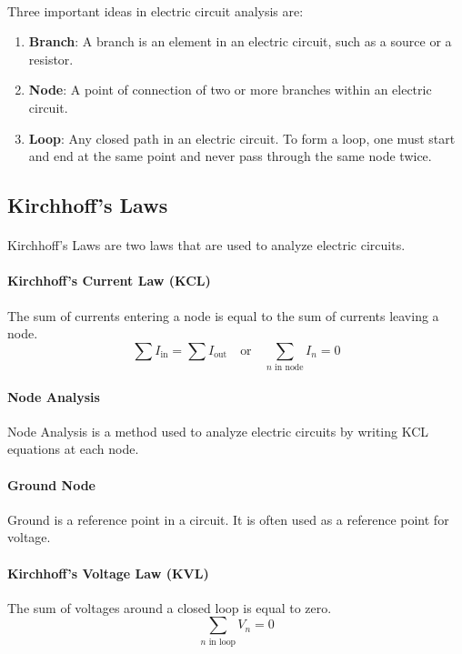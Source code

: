 \documentclass[11pt]{article}
\begin{document}
\paragraph{} Three important ideas in electric circuit analysis are:
\begin{enumerate}
    \item \textbf{Branch}: A branch is an element in an electric circuit, such as a source or a resistor.
    \item \textbf{Node}: A point of connection of two or more branches within an electric circuit.
    \item \textbf{Loop}: Any closed path in an electric circuit. To form a loop, one must start and end at the same point and never pass through the same node twice.
\end{enumerate}
\subsection{Kirchhoff's Laws}
\paragraph{} Kirchhoff's Laws are two laws that are used to analyze electric circuits.
\paragraph{Kirchhoff's Current Law (KCL)} The sum of currents entering a node is equal to the sum of currents leaving a node.
\begin{equation}
    \sum I_{\text{in}} = \sum I_{\text{out}} \quad \text{or} \quad \sum_\text{$n$ in node} I_n = 0
\end{equation}
\paragraph{Node Analysis} Node Analysis is a method used to analyze electric circuits by writing KCL equations at each node.
\paragraph{Ground Node} Ground is a reference point in a circuit. It is often used as a reference point for voltage.
\paragraph{Kirchhoff's Voltage Law (KVL)} The sum of voltages around a closed loop is equal to zero.
\begin{equation}
    \sum_\text{$n$ in loop} V_{n} = 0
\end{equation}
\end{document}
